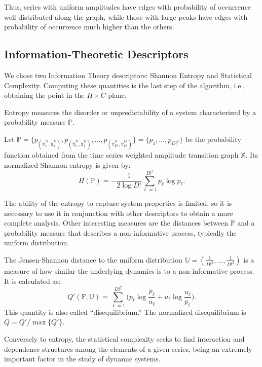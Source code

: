 \documentclass[journal]{IEEEtran}
\begin{document}
	Thus, series with uniform amplitudes have edges with probability of occurrence well distributed along the graph, while those with large peaks have edges with probability of occurrence much higher than the others.
	
	\subsection{Information-Theoretic Descriptors}\label{HC}
	
	We chose two Information Theory descriptors: Shannon Entropy and Statistical Complexity.
	Computing these quantities is the last step of the algorithm, i.e., obtaining the point in the $H \times C$ plane.
	
	Entropy measures the disorder or unpredictability of a system characterized by a probability measure $\mathbb{P}$.
	
	Let $\mathbb{P} = \{p_{(\widetilde\pi^D_1, \widetilde\pi^D_1)}, p_{(\widetilde\pi^D_1, \widetilde\pi^D_2)}, \dots, p_{(\widetilde\pi^D_{D!}, \widetilde\pi^D_{D!})} \} = \{p_1,\dots,p_{D!^2}\}$ be the probability function obtained from the time series weighted amplitude transition graph $\mathbb{X}$.
	Its normalized Shannon entropy is given by:	
	\begin{equation}
	H(\mathbb{P}) = -\frac1{2\log D!}\sum_{\ell=1}^{D!^2} p_{\ell} \log p_{\ell} .
	\label{eq:Entropia}
	\end{equation}
	
	The ability of the entropy to capture system properties is limited, so it is necessary to use it in conjunction with other des\-criptors to obtain a more complete analysis.
	Other interesting measures are the distances between $\mathbb{P}$ and a probability measure that describes a non-informative process, typically the uniform distribution.
	
	The Jensen-Shannon distance to the uniform distribution $\mathbb{U} = (\frac{1}{D!^2}, \dots, \frac{1}{D!^2})$ is a measure of how similar the underlying dynamics is to a non-informative process.
	It is calculated as:
	\begin{equation}
	Q'(\mathbb{P}, \mathbb{U}) = \sum_{\ell=1}^{D!^2} \Big(p_\ell \log\frac{p_\ell}{u_\ell} +
	u_\ell \log\frac{u_\ell}{p_\ell}
	\Big).
	\end{equation}
	This quantity is also called ``disequilibrium.''
	The normalized disequilibrium is $ Q=Q'/\max\{Q'\}$.
	
	Conversely to entropy, the statistical complexity seeks to find interaction and dependence structures among the elements of a given series, being an extremely important factor in the study of dynamic systems.
	
\end{document}
